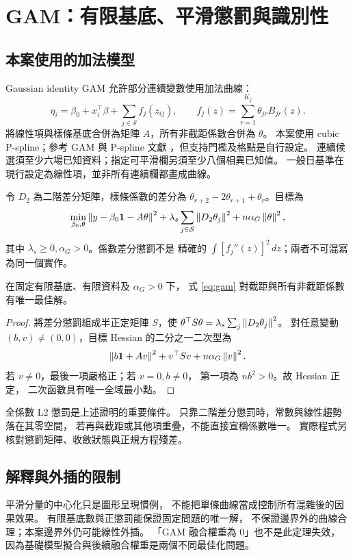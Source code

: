 \section{GAM：有限基底、平滑懲罰與識別性}

\subsection{本案使用的加法模型}
Gaussian identity GAM 允許部分連續變數使用加法曲線：
\begin{equation}
\eta_i=\beta_0+x_i^\top\beta+\sum_{j\in\mathcal S}f_j(z_{ij}),
\qquad f_j(z)=\sum_{r=1}^{K_j}\theta_{jr}B_{jr}(z).
\end{equation}
將線性項與樣條基底合併為矩陣 $A$，所有非截距係數合併為 $\theta$。
本案使用 cubic P-spline；參考 GAM 與 P-spline 文獻
\cite{gam,pspline}，但支持門檻及格點是自行設定。
連續候選須至少六場已知資料；指定可平滑欄另須至少八個相異已知值。
一般日基準在現行設定為線性項，並非所有連續欄都畫成曲線。

令 $D_2$ 為二階差分矩陣，樣條係數的差分為
$\theta_{r+2}-2\theta_{r+1}+\theta_r$。目標為
\begin{equation}
\min_{\beta_0,\theta}
\left\lVert y-\beta_0\mathbf 1-A\theta\right\rVert^2
+\lambda_s\sum_{j\in\mathcal S}\left\lVert D_2\theta_j\right\rVert^2
+n\alpha_G\left\lVert\theta\right\rVert^2,
\label{eq:gam}
\end{equation}
其中 $\lambda_s\ge0,\alpha_G>0$。係數差分懲罰不是
精確的 $\int[f_j''(z)]^2\,dz$；兩者不可混寫為同一個實作。

\begin{theorem}
在固定有限基底、有限資料及 $\alpha_G>0$ 下，
式 \eqref{eq:gam} 對截距與所有非截距係數有唯一最佳解。
\end{theorem}
\begin{proof}
將差分懲罰組成半正定矩陣 $S$，使
$\theta^\top S\theta=\lambda_s\sum_j\left\lVert D_2\theta_j\right\rVert^2$。
對任意變動 $(b,v)\ne(0,0)$，目標 Hessian 的二分之一二次型為
\[
\left\lVert b\mathbf 1+Av\right\rVert^2+v^\top Sv+n\alpha_G\left\lVert v\right\rVert^2 .
\]
若 $v\ne0$，最後一項嚴格正；若 $v=0,b\ne0$，
第一項為 $nb^2>0$。故 Hessian 正定，
二次函數具有唯一全域最小點。
\end{proof}

全係數 L2 懲罰是上述證明的重要條件。
只靠二階差分懲罰時，常數與線性趨勢落在其零空間，
若再與截距或其他項重疊，不能直接宣稱係數唯一。
實際程式另核對懲罰矩陣、收斂狀態與正規方程殘差。

\subsection{解釋與外插的限制}
平滑分量的中心化只是圖形呈現慣例，
不能把單條曲線當成控制所有混雜後的因果效果。
有限基底數與正懲罰能保證固定問題的唯一解，
不保證邊界外的曲線合理；本案邊界外仍可能線性外插。
「GAM 融合權重為 0」也不是此定理失效，
因為基礎模型擬合與後續融合權重是兩個不同最佳化問題。

